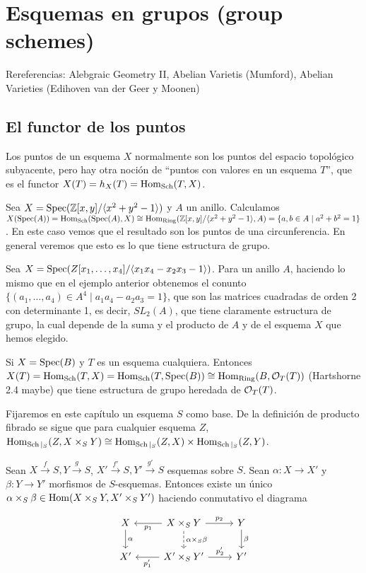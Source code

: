 \documentclass[GA.tex]{subfiles}
\begin{document}

\chapter{Esquemas en grupos (group schemes)}
Rereferencias: Alebgraic Geometry II, Abelian Varietis (Mumford), Abelian Varieties (Edihoven van der Geer y Moonen)

\section{El functor de los puntos}
Los puntos de un esquema $X$ normalmente son los puntos del espacio topológico subyacente, pero hay otra noción de ``puntos con valores en un esquema $T$'', que es el functor $X(T)=h_X(T)=\operatorname{Hom}_{\operatorname{Sch}}(T,X)$. 

\begin{ej}
Sea $X=\operatorname{Spec}(\mathbb{Z}[x,y]/\langle{x^2+y^2-1}\rangle)$ y $A$ un anillo. Calculamos $X(\operatorname{Spec}(A))=\operatorname{Hom}_{\operatorname{Sch}}(\operatorname{Spec}(A),X) \cong\operatorname{Hom}_{\operatorname{Ring}}(\mathbb{Z}[x,y]/\langle{x^2+y^2-1}\rangle,A)=\{a,b\in A\mid a^2+b^2=1\}$. En este caso vemos que el resultado son los puntos de una circunferencia. En general veremos que esto es lo que tiene estructura de grupo. 
\end{ej}
\begin{ej}
Sea $X=\operatorname{Spec}(Z[x_1,\dots, x_4]/\langle{x_1x_4-x_2x_3-1}\rangle)$. Para un anillo $A$, haciendo lo mismo que en el ejemplo anterior obtenemos el conunto $\{(a_1,\dots, a_4)\in A^4\mid a_1a_4-a_2a_3=1\}$, que son las matrices cuadradas de orden 2 con determinante 1, es decir, $SL_2(A)$, que tiene claramente estructura de grupo, la cual depende de la suma y el producto de $A$ y de el esquema $X$ que hemos elegido. 
\end{ej}

\begin{ej}
Si $X=\operatorname{Spec}(B)$ y $T$ es un esquema cualquiera. Entonces $X(T)=\operatorname{Hom}_{\operatorname{Sch}}(T,X)=\operatorname{Hom}_{\operatorname{Sch}}(T,\operatorname{Spec}(B))\cong\operatorname{Hom}_{\operatorname{Ring}}(B,{\mathcal O}_T(T))$ (Hartshorne 2.4 maybe) que tiene estructura de grupo heredada de ${\mathcal O}_T(T)$. 
\end{ej}

Fijaremos en este capítulo un esquema $S$ como base. De la definición de producto fibrado se sigue que para cualquier esquema $Z$, $\operatorname{Hom}_{\operatorname{Sch}|_S}(Z,X\times_S Y)\cong\operatorname{Hom}_{\operatorname{Sch}|_S}(Z,X)\times \operatorname{Hom}_{\operatorname{Sch}|_S}(Z,Y)$. 

\begin{observacion}
Sean $X\xrightarrow{f}S, Y\xrightarrow{g}S$, $X'\xrightarrow{f'}S, Y'\xrightarrow{g'}S$ esquemas sobre $S$. Sean $\alpha:X\to X'$ y $\beta:Y\to Y'$ morfismos de $S$-esquemas. Entonces existe un único $\alpha\times_S\beta\in\operatorname{Hom}(X\times_SY,X'\times_SY')$ haciendo conmutativo el diagrama 

\[
\begin{tikzcd}
X\arrow[d, "\alpha"] & X\times_SY\arrow[l, "p_1"]\arrow[r, "p_2"]\arrow[d, dashed, "\alpha\times_S\beta"] & Y\arrow[d, "\beta"]\\
X' &X'\times_SY'\arrow[l, "p_1'"]\arrow[r, "p_2'"] & Y'
\end{tikzcd}
\]
\end{observacion}
\end{document}

